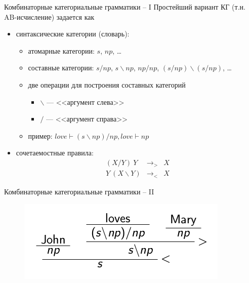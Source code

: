 \documentclass{beamer}
\begin{document}
\begin{frame}{Комбинаторные категориальные грамматики -- I}
Простейший вариант КГ (т.н. AB-исчисление) задается как\\
\medskip
\begin{itemize}
    \item синтаксические категории (словарь):
      \begin{itemize}
        \item атомарные категории: $s$, $np$, \ldots
        \item составные категории: $s/np$, $s \backslash np$, $np/np$, $(s/np) \backslash (s/np)$, \ldots
        \item две операции для построения составных категорий
          \begin{itemize}
            \item $\backslash$ --- <<аргумент слева>>
            \item $/$ --- <<аргумент справа>>
          \end{itemize}
        \item пример: $love \vdash (s \backslash np) / np, love \vdash np$
      \end{itemize}
      \medskip
    \item сочетаемостные правила:
      \begin{eqnarray*}
        (X / Y)~Y &\rightarrow_{>}& X \\
        Y~(X \backslash Y) &\rightarrow_{<}& X
      \end{eqnarray*}
\end{itemize}
\end{frame}

\begin{frame}{Комбинаторные категориальные грамматики -- II}
\begin{center}
	\begin{figure}[H]
		\includegraphics[scale=0.5]{ccg1.png} 
	\end{figure}
\end{center}
\end{frame}
\end{document}
